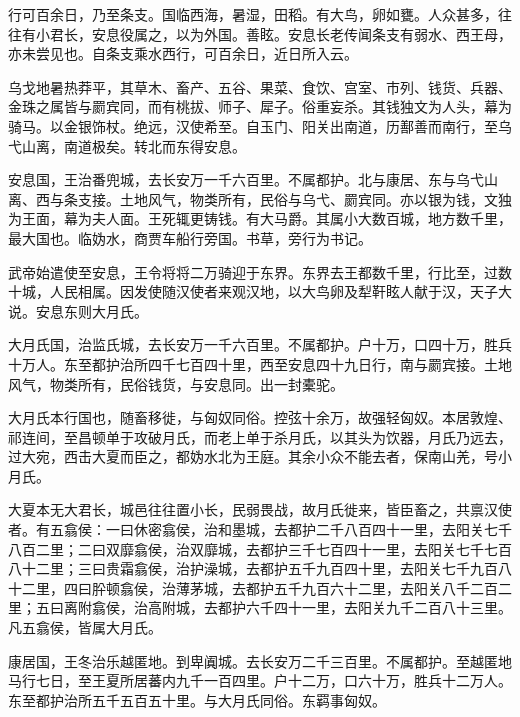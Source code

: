 \documentclass[12pt,UTF8]{ctexbook}
\begin{document}
行可百余日，乃至条支。国临西海，暑湿，田稻。有大鸟，卵如甕。人众甚多，往往有小君长，安息役属之，以为外国。善眩。安息长老传闻条支有弱水、西王母，亦未尝见也。自条支乘水西行，可百余日，近日所入云。



乌戈地暑热莽平，其草木、畜产、五谷、果菜、食饮、宫室、市列、钱货、兵器、金珠之属皆与罽宾同，而有桃拔、师子、犀子。俗重妄杀。其钱独文为人头，幕为骑马。以金银饰杖。绝远，汉使希至。自玉门、阳关出南道，历鄯善而南行，至乌弋山离，南道极矣。转北而东得安息。



安息国，王治番兜城，去长安万一千六百里。不属都护。北与康居、东与乌弋山离、西与条支接。土地风气，物类所有，民俗与乌弋、罽宾同。亦以银为钱，文独为王面，幕为夫人面。王死辄更铸钱。有大马爵。其属小大数百城，地方数千里，最大国也。临妫水，商贾车船行旁国。书草，旁行为书记。



武帝始遣使至安息，王令将将二万骑迎于东界。东界去王都数千里，行比至，过数十城，人民相属。因发使随汉使者来观汉地，以大鸟卵及犁靬眩人献于汉，天子大说。安息东则大月氏。



大月氏国，治监氏城，去长安万一千六百里。不属都护。户十万，口四十万，胜兵十万人。东至都护治所四千七百四十里，西至安息四十九日行，南与罽宾接。土地风气，物类所有，民俗钱货，与安息同。出一封橐驼。



大月氏本行国也，随畜移徙，与匈奴同俗。控弦十余万，故强轻匈奴。本居敦煌、祁连间，至昌顿单于攻破月氏，而老上单于杀月氏，以其头为饮器，月氏乃远去，过大宛，西击大夏而臣之，都妫水北为王庭。其余小众不能去者，保南山羌，号小月氏。



大夏本无大君长，城邑往往置小长，民弱畏战，故月氏徙来，皆臣畜之，共禀汉使者。有五翕侯：一曰休密翕侯，治和墨城，去都护二千八百四十一里，去阳关七千八百二里；二曰双靡翕侯，治双靡城，去都护三千七百四十一里，去阳关七千七百八十二里；三曰贵霜翕侯，治护澡城，去都护五千九百四十里，去阳关七千九百八十二里，四曰肸顿翕侯，治薄茅城，去都护五千九百六十二里，去阳关八千二百二里；五曰离附翕侯，治高附城，去都护六千四十一里，去阳关九千二百八十三里。凡五翕侯，皆属大月氏。



康居国，王冬治乐越匿地。到卑阗城。去长安万二千三百里。不属都护。至越匿地马行七日，至王夏所居蕃内九千一百四里。户十二万，口六十万，胜兵十二万人。东至都护治所五千五百五十里。与大月氏同俗。东羁事匈奴。
\end{document}
